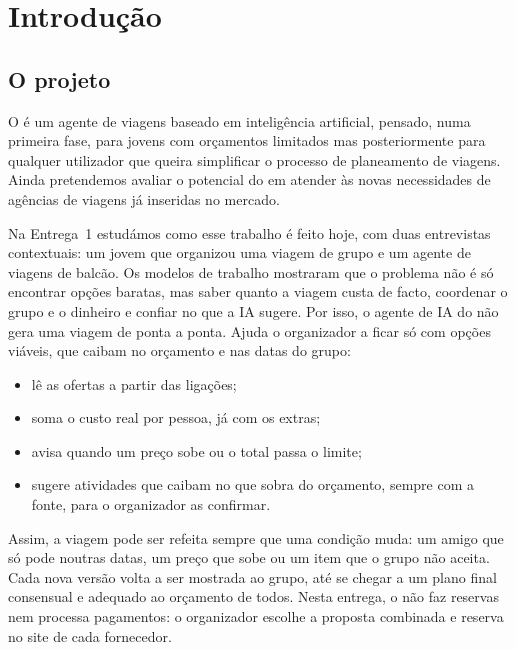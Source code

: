 \section*{Introdução}\label{sec:introducao}

\subsection*{O projeto \projeto}

O \projeto{} é um agente de viagens baseado em inteligência artificial,
pensado, numa primeira fase, para jovens com orçamentos limitados
mas posteriormente para qualquer utilizador que queira simplificar o processo de planeamento de viagens.
Ainda pretendemos avaliar o potencial do \projeto{} em atender às novas necessidades de agências de viagens já
inseridas no mercado.

Na Entrega~1 estudámos como esse trabalho é feito hoje, com duas entrevistas contextuais: um jovem que organizou uma
viagem de grupo e um agente de viagens de balcão. Os modelos de trabalho mostraram que o problema não é só encontrar
opções baratas, mas saber quanto a viagem custa de facto, coordenar o grupo e o dinheiro e confiar no que a IA sugere.
Por isso, o agente de IA do \projeto{} não gera uma viagem de ponta a ponta. Ajuda o organizador a ficar só com opções
viáveis, que caibam no orçamento e nas datas do grupo:
\begin{itemize}
  \item lê as ofertas a partir das ligações;
  \item soma o custo real por pessoa, já com os extras;
  \item avisa quando um preço sobe ou o total passa o limite;
  \item sugere atividades que caibam no que sobra do orçamento, sempre com a fonte, para o organizador as confirmar.
\end{itemize}
Assim, a viagem pode ser refeita sempre que uma condição muda: um amigo que só pode noutras datas, um preço que sobe ou um
item que o grupo não aceita. Cada nova versão volta a ser mostrada ao grupo, até se chegar a um plano final consensual e
adequado ao orçamento de todos. Nesta entrega, o \projeto{} não faz reservas nem processa pagamentos: o organizador escolhe
a proposta combinada e reserva no site de cada fornecedor.

